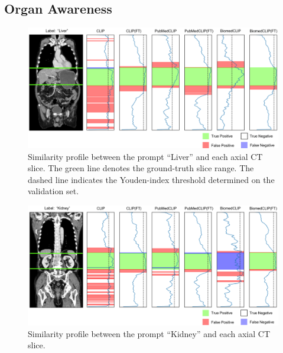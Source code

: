 \documentclass[bioengineering,article,submit,pdftex,moreauthors]{Definitions/mdpi}
\begin{document}
\clearpage


\subsection{Organ Awareness}

\begin{figure}[ht]
  \centering
  \includegraphics[width=1\textwidth]{./figures/app_organ_aware_liver_2.png}
  \caption{Similarity profile between the prompt “Liver” and each axial CT slice. 
  The green line denotes the ground-truth slice range. 
  The dashed line indicates the Youden-index threshold determined on the validation set.}
  \label{fig:organ_aware_liver}
\end{figure}


\begin{figure}[ht]
  \centering
  \includegraphics[width=1\textwidth]{./figures/app_organ_aware_kidney_2.png}
  \caption{Similarity profile between the prompt “Kidney” and each axial CT slice.}
  \label{fig:organ_aware_kidney}
\end{figure}

\clearpage
\end{document}
